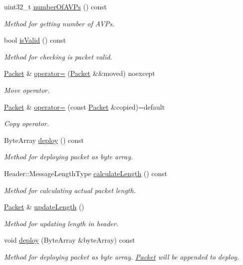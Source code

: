\begin{DoxyCompactItemize}
uint32\+\_\+t \hyperlink{classDiameter_1_1Packet_a9b11aa0f60e2a9cec525d98f6b1d8808}{number\+Of\+A\+V\+Ps} () const
\begin{DoxyCompactList}\small\item\em Method for getting number of A\+V\+Ps. \end{DoxyCompactList}\item 
bool \hyperlink{classDiameter_1_1Packet_ab6077555d623ff342c4821c0a0e29285}{is\+Valid} () const
\begin{DoxyCompactList}\small\item\em Method for checking is packet valid. \end{DoxyCompactList}\item 
\hyperlink{classDiameter_1_1Packet}{Packet} \& \hyperlink{classDiameter_1_1Packet_a80abbedae208ece043c406a87b8876af}{operator=} (\hyperlink{classDiameter_1_1Packet}{Packet} \&\&moved) noexcept
\begin{DoxyCompactList}\small\item\em Move operator. \end{DoxyCompactList}\item 
\hyperlink{classDiameter_1_1Packet}{Packet} \& \hyperlink{classDiameter_1_1Packet_aa96abe75677e27722927afb4e22b6800}{operator=} (const \hyperlink{classDiameter_1_1Packet}{Packet} \&copied)=default
\begin{DoxyCompactList}\small\item\em Copy operator. \end{DoxyCompactList}\item 
Byte\+Array \hyperlink{classDiameter_1_1Packet_a6120f6d21c5d2f4c4ed4a8602953923c}{deploy} () const
\begin{DoxyCompactList}\small\item\em Method for deploying packet as byte array. \end{DoxyCompactList}\item 
Header\+::\+Message\+Length\+Type \hyperlink{classDiameter_1_1Packet_ae9926218252f08fcdbc937d16d496984}{calculate\+Length} () const
\begin{DoxyCompactList}\small\item\em Method for calculating actual packet length. \end{DoxyCompactList}\item 
\hyperlink{classDiameter_1_1Packet}{Packet} \& \hyperlink{classDiameter_1_1Packet_a822041d59387ef2a8c0f48c2c4bc1054}{update\+Length} ()
\begin{DoxyCompactList}\small\item\em Method for updating length in header. \end{DoxyCompactList}\item 
void \hyperlink{classDiameter_1_1Packet_a2a41d20364b4b73787c9cf5af2ee6001}{deploy} (Byte\+Array \&byte\+Array) const
\begin{DoxyCompactList}\small\item\em Method for deploying packet as byte array. \hyperlink{classDiameter_1_1Packet}{Packet} will be appended to deploy. \end{DoxyCompactList}\end{DoxyCompactItemize}


